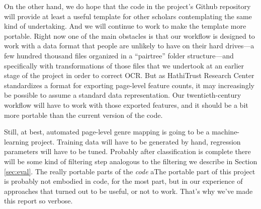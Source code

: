 \documentclass[paper=a4, fontsize=12pt]{scrartcl}
\numberwithin{equation}{section}		%
\numberwithin{figure}{section}			%
\numberwithin{table}{section}				%
\begin{document}
On the other hand, we do hope that the code in the project's Github repository will provide at least a useful template for other scholars contemplating the same kind of undertaking. And we will continue to work to make the template more portable. Right now one of the main obstacles is that our workflow is designed to work with a data format that people are unlikely to have on their hard drives---a few hundred thousand files organized in a ``pairtree'' folder structure---and specifically with transformations of those files that we undertook at an earlier stage of the project in order to correct OCR. But as HathiTrust Research Center standardizes a format for exporting page-level feature counts, it may increasingly be possible to assume a standard data representation. Our twentieth-century workflow will have to work with those exported features, and it should be a bit more portable than the current version of the code.

Still, at best, automated page-level genre mapping is going to be a machine-learning project. Training data will have to be generated by hand, regression parameters will have to be tuned. Probably after classification is complete there will be some kind of filtering step analogous to the filtering we describe in Section \ref{sec:eval}. The really portable parts of the \textit{code} aThe portable part of this project is probably not embodied in code, for the most part, but in our experience of approaches that turned out to be useful, or not to work. That's why we've made this report so verbose.

\newpage



\end{document}
